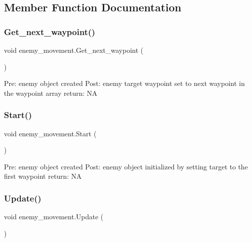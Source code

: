 \subsection{Member Function Documentation}
\mbox{\label{classenemy__movement_a0fef8fb95fe93bdc18288cd04cb0af12}} 
\subsubsection{\texorpdfstring{Get\+\_\+next\+\_\+waypoint()}{Get\_next\_waypoint()}}
{\footnotesize\ttfamily void enemy\+\_\+movement.\+Get\+\_\+next\+\_\+waypoint (\begin{DoxyParamCaption}{ }\end{DoxyParamCaption})\hspace{0.3cm}{\ttfamily [private]}}

Pre\+: enemy object created Post\+: enemy target waypoint set to next waypoint in the waypoint array return\+: NA \mbox{\label{classenemy__movement_a6f78b4e6952786e1ee8d7063b4c59dba}} 
\subsubsection{\texorpdfstring{Start()}{Start()}}
{\footnotesize\ttfamily void enemy\+\_\+movement.\+Start (\begin{DoxyParamCaption}{ }\end{DoxyParamCaption})\hspace{0.3cm}{\ttfamily [private]}}

Pre\+: enemy object created Post\+: enemy object initialized by setting target to the first waypoint return\+: NA \mbox{\label{classenemy__movement_a6937591e8d99aec470f81199b0850967}} 
\subsubsection{\texorpdfstring{Update()}{Update()}}
{\footnotesize\ttfamily void enemy\+\_\+movement.\+Update (\begin{DoxyParamCaption}{ }\end{DoxyParamCaption})\hspace{0.3cm}{\ttfamily [private]}}

